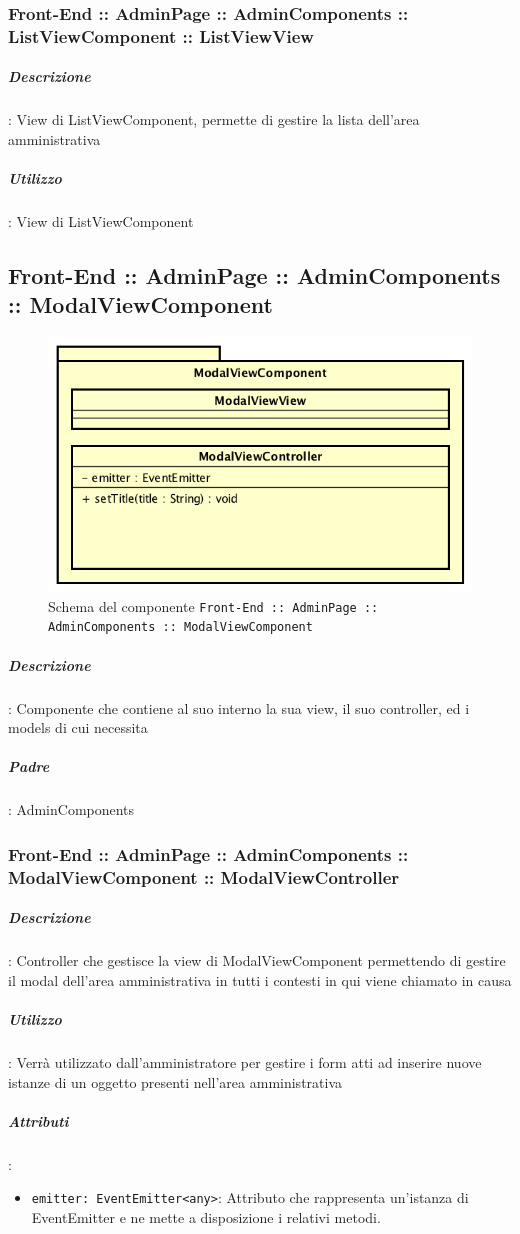 \documentclass[../ManualeSviluppatore_v2.0.0.tex]{subfiles}
\begin{document}
			      \subsubsection{Front-End :: AdminPage :: AdminComponents :: ListViewComponent :: ListViewView}
			      	\subparagraph{Descrizione}: View di ListViewComponent, permette di gestire la lista dell'area amministrativa
			      	\subparagraph{Utilizzo}: View di ListViewComponent
\newpage
	\subsection{Front-End :: AdminPage :: AdminComponents :: ModalViewComponent}
	\begin{figure}[!h]
		\centering
		\includegraphics[scale=0.6]{Architettura/Front-End/AdminPage/AdminComponents/ModalViewComponent.png}
		\caption{Schema del componente \texttt{Front-End :: AdminPage :: AdminComponents :: ModalViewComponent}}
	\end{figure}

			\subparagraph{Descrizione}: Componente che contiene al suo interno la sua view, il suo controller, ed i models di cui necessita
			\subparagraph{Padre}: AdminComponents
				\subsubsection{Front-End :: AdminPage :: AdminComponents :: ModalViewComponent :: ModalViewController}
					\subparagraph{Descrizione}: Controller che gestisce la view di ModalViewComponent permettendo di gestire il modal dell'area amministrativa in tutti i contesti in qui viene chiamato in causa
					\subparagraph{Utilizzo}: Verrà utilizzato dall'amministratore per gestire i form atti ad inserire nuove istanze di un oggetto presenti nell'area amministrativa
					\subparagraph{Attributi}:
					      \begin{itemize}
			      	      	\item \texttt{emitter: EventEmitter<any>}: Attributo che rappresenta un'istanza di EventEmitter e ne mette a disposizione i relativi metodi.
			      	      \end{itemize}
\end{document}
